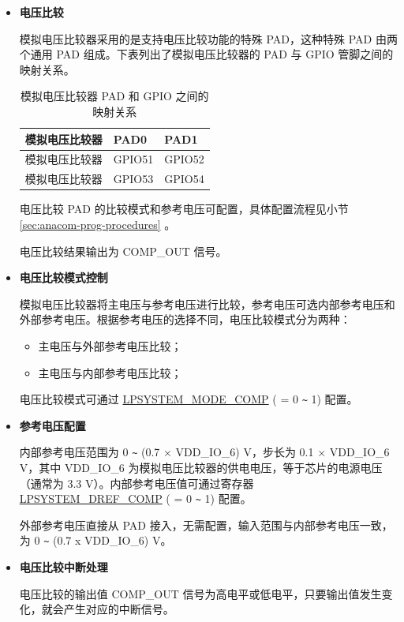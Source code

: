 \documentclass[main\_\_CN.tex]{subfiles}
\begin{document}
\begin{itemize}

    \item {\bfseries 电压比较}
    
          模拟电压比较器采用的是支持电压比较功能的特殊 PAD，这种特殊 PAD 由两个通用 PAD 组成。下表列出了模拟电压比较器的 PAD 与 GPIO 管脚之间的映射关系。
          
          \begin{longtable}{ | L{5cm} | L{2cm} | L{2cm} | }
          \caption{模拟电压比较器 PAD 和 GPIO 之间的映射关系} \label{tab:anacom-pad-gpio-mapping}\\ \hline
          \textbf{模拟电压比较器} & \textbf{PAD0}  &  \textbf{PAD1}\\ \hline
          模拟电压比较器  & GPIO51  &  GPIO52  \\ \hline
          模拟电压比较器  & GPIO53  & GPIO54   \\ \hline
          \end{longtable}
        
          电压比较 PAD 的比较模式和参考电压可配置，具体配置流程见小节 \ref{sec:anacom-prog-procedures} 。
        
          电压比较结果输出为 COMP\_OUT 信号。
    
    \item {\bfseries 电压比较模式控制}

          模拟电压比较器将主电压与参考电压进行比较，参考电压可选内部参考电压和外部参考电压。根据参考电压的选择不同，电压比较模式分为两种：

          \begin{itemize}
            \item 主电压与外部参考电压比较；
            \item 主电压与内部参考电压比较；
          \end{itemize}
        
          电压比较模式可通过 \hyperref[fielddesc:LPSYSTEMMODECOMP0]{LPSYSTEM\_MODE\_COMP} ( = 0 \verb+~+ 1) 配置。
    
    \item {\bfseries 参考电压配置}

          内部参考电压范围为 0 \verb+~+ (0.7 × VDD\_IO\_6) V，步长为 0.1 × VDD\_IO\_6 V，其中 VDD\_IO\_6 为模拟电压比较器的供电电压，等于芯片的电源电压（通常为 3.3 V）。内部参考电压值可通过寄存器 \hyperref[fielddesc:LPSYSTEMDREFCOMP0]{LPSYSTEM\_DREF\_COMP} ( = 0 \verb+~+ 1) 配置。
        
          外部参考电压直接从 PAD 接入，无需配置，输入范围与内部参考电压一致，为 0 \verb+~+ (0.7 x VDD\_IO\_6) V。

    \item {\bfseries 电压比较中断处理}
        
          电压比较的输出值 COMP\_OUT 信号为高电平或低电平，只要输出值发生变化，就会产生对应的中断信号。

\end{itemize}
\end{document}
